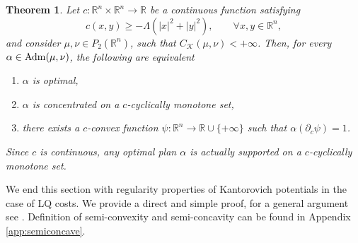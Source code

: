 \documentclass[reqno]{amsart}
\theoremstyle{plain}
\newtheorem{thm}{Theorem}[section]
\theoremstyle{definition}
\theoremstyle{remark}
\newcommand{\Adm}{{\rm Adm}}
\begin{document}
	
    \begin{thm}\label{supp_opt_plans} Let $c:\mathbb{R}^n\times\mathbb{R}^n\to\mathbb{R}$ be a continuous function satisfying 
		\begin{equation}\label{hp_quadraticity_cost}
			c(x,y)\geq -\Lambda(|x|^2+|y|^2),\qquad\forall x,y \in\mathbb{R}^n,
		\end{equation}
		and consider $\mu,\nu\in P_2(\mathbb{R}^n)$, such that $C_{\mathcal{K}}(\mu,\nu)<+\infty$. Then, for every $\alpha\in\Adm(\mu,\nu)$, the following are equivalent
		\begin{enumerate}
			\item $\alpha$ is optimal,
			\item $\alpha$ is concentrated on a $c$-cyclically monotone set,
                \item there exists a $c$-convex function $\psi:\mathbb{R}^n\to\mathbb{R}\cup\{+\infty\}$ such that $\alpha(\partial_c\psi)=1$.
		\end{enumerate}
       Since $c$ is continuous, any optimal plan $\alpha$ is actually supported on a $c$-cyclically monotone set.
       \end{thm}
    
We end this section with regularity properties of Kantorovich potentials in the case of LQ costs. We provide a direct and simple proof, for a general argument see \cite[Theorem 10.26]{Villanioldandnew}. Definition of semi-convexity and semi-concavity can be found in Appendix \ref{app:semiconcave}.
\end{document}
